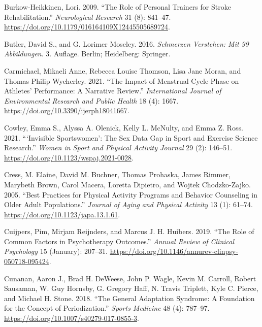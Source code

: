 \documentclass[
  letterpaper,
  DIV=11,
  numbers=noendperiod]{scrreprt}
\newlength{\cslhangindent}
\newenvironment{CSLReferences}[2] %
 {\begin{list}{}{%
  \setlength{\itemindent}{0pt}
  \setlength{\leftmargin}{0pt}
  \setlength{\parsep}{0pt}
  \ifodd #1
   \setlength{\leftmargin}{\cslhangindent}
   \setlength{\itemindent}{-1\cslhangindent}
  \fi
  \setlength{\itemsep}{#2\baselineskip}}}
 {\end{list}}
\begin{document}
\begin{CSLReferences}{1}{0}
Burkow-Heikkinen, Lori. 2009. {``The Role of Personal Trainers for
Stroke Rehabilitation.''} \emph{Neurological Research} 31 (8): 841--47.
\url{https://doi.org/10.1179/016164109X12445505689724}.

Butler, David S., and G. Lorimer Moseley. 2016. \emph{Schmerzen
Verstehen: {Mit} 99 {Abbildungen}}. 3. Auflage. Berlin; Heidelberg:
Springer.

Carmichael, Mikaeli Anne, Rebecca Louise Thomson, Lisa Jane Moran, and
Thomas Philip Wycherley. 2021. {``The {Impact} of {Menstrual Cycle
Phase} on {Athletes}' {Performance}: {A Narrative Review}.''}
\emph{International Journal of Environmental Research and Public Health}
18 (4): 1667. \url{https://doi.org/10.3390/ijerph18041667}.

Cowley, Emma S., Alyssa A. Olenick, Kelly L. McNulty, and Emma Z. Ross.
2021. {``{`{Invisible Sportswomen}'}: {The Sex Data Gap} in {Sport} and
{Exercise Science Research}.''} \emph{Women in Sport and Physical
Activity Journal} 29 (2): 146--51.
\url{https://doi.org/10.1123/wspaj.2021-0028}.

Cress, M. Elaine, David M. Buchner, Thomas Prohaska, James Rimmer,
Marybeth Brown, Carol Macera, Loretta Dipietro, and Wojtek
Chodzko-Zajko. 2005. {``Best Practices for Physical Activity Programs
and Behavior Counseling in Older Adult Populations.''} \emph{Journal of
Aging and Physical Activity} 13 (1): 61--74.
\url{https://doi.org/10.1123/japa.13.1.61}.

Cuijpers, Pim, Mirjam Reijnders, and Marcus J. H. Huibers. 2019. {``The
{Role} of {Common Factors} in {Psychotherapy Outcomes}.''} \emph{Annual
Review of Clinical Psychology} 15 (January): 207--31.
\url{https://doi.org/10.1146/annurev-clinpsy-050718-095424}.

Cunanan, Aaron J., Brad H. DeWeese, John P. Wagle, Kevin M. Carroll,
Robert Sausaman, W. Guy Hornsby, G. Gregory Haff, N. Travis Triplett,
Kyle C. Pierce, and Michael H. Stone. 2018. {``The {General Adaptation
Syndrome}: {A Foundation} for the {Concept} of {Periodization}.''}
\emph{Sports Medicine} 48 (4): 787--97.
\url{https://doi.org/10.1007/s40279-017-0855-3}.


\end{CSLReferences}
\end{document}
